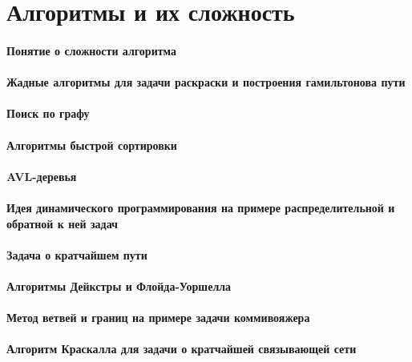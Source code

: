 \documentclass[russian,twocolumn]{article}
\begin{document}
\section{Алгоритмы и их сложность}

\paragraph{Понятие о сложности алгоритма}

\paragraph{Жадные алгоритмы для задачи раскраски и построения гамильтонова пути}

\paragraph{Поиск по графу}

\paragraph{Алгоритмы быстрой сортировки}

\paragraph{AVL-деревья}

\paragraph{Идея динамического программирования на примере распределительной и обратной к ней задач}

\paragraph{Задача о кратчайшем пути}

\paragraph{Алгоритмы Дейкстры и Флойда-Уоршелла}

\paragraph{Метод ветвей и границ на примере задачи коммивояжера}

\paragraph{Алгоритм Краскалла для задачи о кратчайшей связывающей сети}
\end{document}
